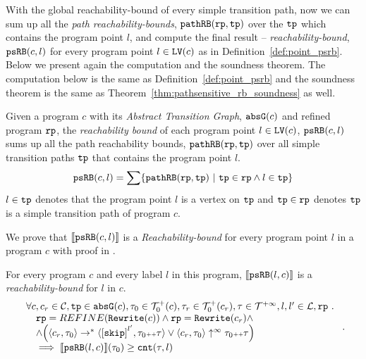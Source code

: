 With the global reachability-bound of every simple transition path, now we can sum up all the \emph{path reachability-bounds}, $\mathtt{pathRB}(\mathtt{rp}, \mathtt{tp})$ over the $\mathtt{tp}$ which contains the program point $l$, and compute the final result -- \emph{reachability-bound}, $\mathtt{psRB}(c, l)$ for every program point $l \in \mathtt{LV}(c)$ as in Definition~\ref{def:point_psrb}.
Below we present again the computation and the soundness theorem.
The computation below is the same as Definition~\ref{def:point_psrb}
and the soundness theorem is the same as Theorem~\ref{thm:pathsensitive_rb_soundness} as well.
 \begin{definition}
  Given a program $c$ with its \emph{Abstract Transition Graph}, $\mathtt{abs}{\mathtt{G}}(c)$ and refined program $\mathtt{rp}$,
  the \emph{reachability bound} of each program point $l \in \mathtt{LV}(c)$, $\mathtt{psRB}(c, l)$ 
  sums up all the path reachability bounds, $\mathtt{pathRB}(\mathtt{rp}, \mathtt{tp})$ over all simple transition paths $\mathtt{tp}$ that contains the program point $l$.
  \[ 
    \psRB(c, l) = 
    \sum
    \left\{ \inoutB(\rprog, \tpath) ~\vert~ \tpath \in \rprog \land 
    l \in \tpath \right\}
  \]
  $l \in \mathtt{tp}$ denotes that the program point $l$ is a vertex on $\mathtt{tp}$ 
  and $\mathtt{tp} \in \mathtt{rp}$ denotes $\mathtt{tp}$ is a simple transition path of program $c$.
 \end{definition}
We prove that $\llbracket \mathtt{psRB}(c, l) \rrbracket$ is a \emph{Reachability-bound} for every program point $l$ in a program $c$ with proof in .
\begin{theorem}
  For every program ${c}$ and every label $l$ in this program,
  $\llbracket \mathtt{psRB}(l, c) \rrbracket$ is a \emph{reachability-bound} for $l$ in $c$.
  \[
   \begin{array}{l}
   \forall c, c_r \in \cdom, \tpath \in \absG(c), \trace_0 \in \ftdom_0(c), \trace_r \in \ftdom_0(c_r), \trace \in \tdom, l, l' \in \ldom, \rprog \sthat 
   \\ \quad
   \rprog = REFINE(\algrewrite(c))
   \land 
   \rprog = \algrewrite(c_r)
   \land
   \\ \quad
   \land
   \Big(
   \config{c_r, \trace_0} \rightarrow^* \config{\clabel{\eskip}^{l'}, \trace_0 \tracecat \trace}
   \lor \config{c_r, \trace_0} \uparrow^{\infty} \trace_0 \tracecat \trace 
   \Big)
   \\ \quad
   \implies \econfig{\psRB(l, c)}(\trace_0) \geq \counter(\trace, l)
   \end{array}.
  \]
\end{theorem}
